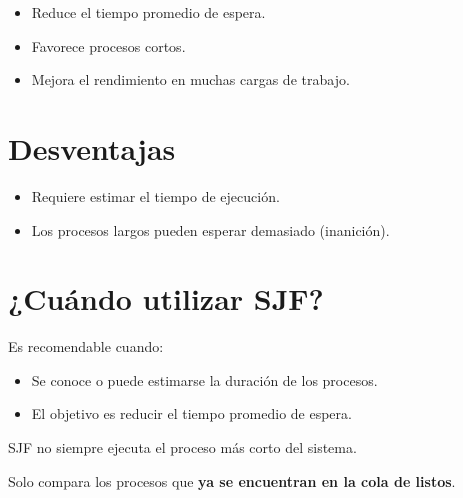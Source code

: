 \documentclass[
  spanish,
  letterpaper,
]{scrbook}
\providecommand{\tightlist}{%
  \setlength{\itemsep}{0pt}\setlength{\parskip}{0pt}}
\begin{document}
\begin{itemize}
\tightlist
\item
  Reduce el tiempo promedio de espera.
\item
  Favorece procesos cortos.
\item
  Mejora el rendimiento en muchas cargas de trabajo.
\end{itemize}


\chapter{Desventajas}\label{desventajas-1}

\begin{itemize}
\tightlist
\item
  Requiere estimar el tiempo de ejecución.
\item
  Los procesos largos pueden esperar demasiado (inanición).
\end{itemize}


\chapter{¿Cuándo utilizar SJF?}\label{cuuxe1ndo-utilizar-sjf}

Es recomendable cuando:

\begin{itemize}
\tightlist
\item
  Se conoce o puede estimarse la duración de los procesos.
\item
  El objetivo es reducir el tiempo promedio de espera.
\end{itemize}

\begin{tcolorbox}[enhanced jigsaw, arc=.35mm, bottomrule=.15mm, bottomtitle=1mm, breakable, colback=white, colbacktitle=quarto-callout-warning-color!10!white, colframe=quarto-callout-warning-color-frame, coltitle=black, left=2mm, leftrule=.75mm, opacityback=0, opacitybacktitle=0.6, rightrule=.15mm, title=\textcolor{quarto-callout-warning-color}{\faExclamationTriangle}\hspace{0.5em}{Error común}, titlerule=0mm, toprule=.15mm, toptitle=1mm]

SJF no siempre ejecuta el proceso más corto del sistema.

Solo compara los procesos que \textbf{ya se encuentran en la cola de
listos}.

\end{tcolorbox}
\end{document}
